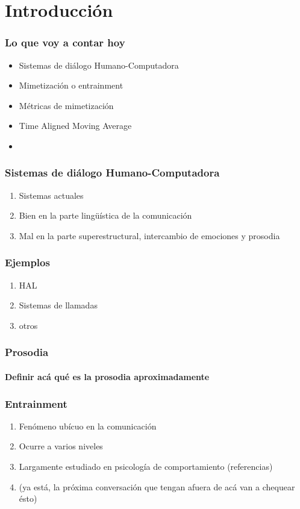 \documentclass{beamer}
\title{\tituloTesis}
\author{Juan Manuel Pérez}
\begin{document}
\frame{\titlepage}


\section{Introducción}

\begin{frame}
  \frametitle{Lo que voy a contar hoy}
  \centering{}
  \begin{itemize}
    \item Sistemas de diálogo Humano-Computadora
    \item Mimetización o entrainment
    \item Métricas de mimetización
    \item Time Aligned Moving Average
    \item
  \end{itemize}

\end{frame}


\begin{frame}
  \frametitle{Sistemas de diálogo Humano-Computadora}

  \begin{enumerate}
    \item Sistemas actuales
    \item Bien en la parte lingüística de la comunicación
    \item Mal en la parte superestructural, intercambio de emociones y prosodia
  \end{enumerate}
\end{frame}


\begin{frame}
  \frametitle{Ejemplos}
  \begin{enumerate}
    \item HAL
    \item Sistemas de llamadas
    \item otros
  \end{enumerate}
\end{frame}


\begin{frame}
  \frametitle{Prosodia}
  \framesubtitle{Definir acá qué es la prosodia aproximadamente}

\end{frame}



\begin{frame}
  \frametitle{Entrainment}

  \begin{enumerate}
    \item Fenómeno ubícuo en la comunicación
    \item Ocurre a varios niveles
    \item Largamente estudiado en psicología de comportamiento (referencias)
    \item (ya está, la próxima conversación que tengan afuera de acá van a chequear ésto)
  \end{enumerate}
\end{frame}
\end{document}
